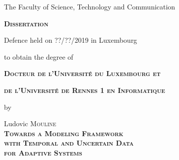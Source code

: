 \documentclass[12pt, twoside]{book}
\begin{document}
\begin{center}         
         \vspace{0.6cm}\noindent
         
         The Faculty of Science, Technology and Communication
         
         \vspace{1cm}\noindent
         {\LARGE \textbf{\textsc{Dissertation}}}
         
         \vspace{0.8cm}
         \noindent
         Defence held on ??/??/2019 in Luxembourg
         
         \vspace{0.5cm}\noindent
         to obtain the degree of
         
         \vspace{1.2cm}\noindent
         {\Large \textbf{\textsc{Docteur de l'Université du Luxembourg et}}}

         \vspace{0.2cm}\noindent
         {\Large \textbf{\textsc{de l'Université de Rennes 1 en Informatique}}}

         \vspace{0.5cm}\noindent
         {\Large by}

         \vspace{0.5cm}\noindent
         {\Large Ludovic \textsc{Mouline}}\\

         \vspace{1cm}\noindent
         {\LARGE \textbf{\textsc{Towards a Modeling Framework}}}\\[0.4cm] 
         {\LARGE \textbf{\textsc{ with Temporal and Uncertain Data}}}\\[0.4cm]
                  {\LARGE \textbf{\textsc{for Adaptive Systems}}}\\[0.4cm]
\end{center}

\vspace{0.4cm}
\end{document}
